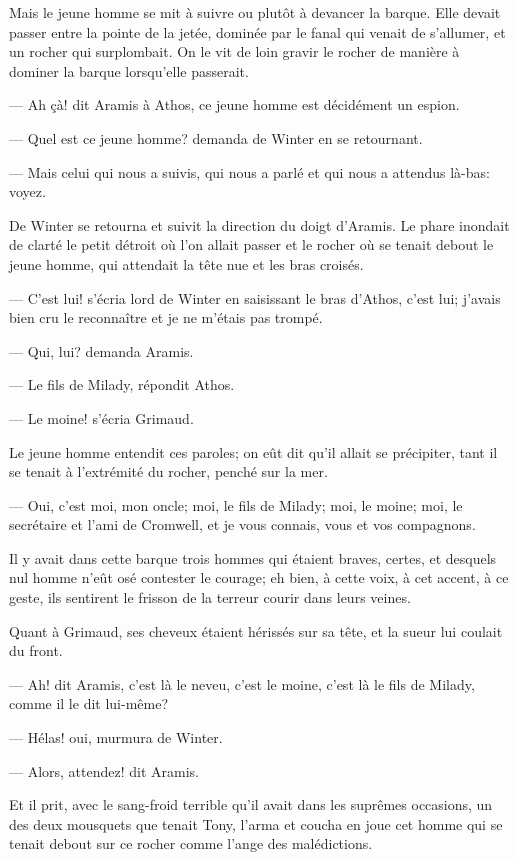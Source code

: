 Mais le jeune homme se mit à suivre ou plutôt à devancer la barque. Elle devait passer entre la pointe de la jetée, dominée par le fanal qui venait de s'allumer, et un rocher qui surplombait. On le vit de loin gravir le rocher de manière à dominer la barque lorsqu'elle passerait.

— Ah çà! dit Aramis à Athos, ce jeune homme est décidément un espion.

— Quel est ce jeune homme? demanda de Winter en se retournant.

— Mais celui qui nous a suivis, qui nous a parlé et qui nous a attendus là-bas: voyez.

De Winter se retourna et suivit la direction du doigt d'Aramis. Le phare inondait de clarté le petit détroit où l'on allait passer et le rocher où se tenait debout le jeune homme, qui attendait la tête nue et les bras croisés.

— C'est lui! s'écria lord de Winter en saisissant le bras d'Athos, c'est lui; j'avais bien cru le reconnaître et je ne m'étais pas trompé.

— Qui, lui? demanda Aramis.

— Le fils de Milady, répondit Athos.

— Le moine! s'écria Grimaud.

Le jeune homme entendit ces paroles; on eût dit qu'il allait se précipiter, tant il se tenait à l'extrémité du rocher, penché sur la mer.

— Oui, c'est moi, mon oncle; moi, le fils de Milady; moi, le moine; moi, le secrétaire et l'ami de Cromwell, et je vous connais, vous et vos compagnons.

Il y avait dans cette barque trois hommes qui étaient braves, certes, et desquels nul homme n'eût osé contester le courage; eh bien, à cette voix, à cet accent, à ce geste, ils sentirent le frisson de la terreur courir dans leurs veines.

Quant à Grimaud, ses cheveux étaient hérissés sur sa tête, et la sueur lui coulait du front.

— Ah! dit Aramis, c'est là le neveu, c'est le moine, c'est là le fils de Milady, comme il le dit lui-même?

— Hélas! oui, murmura de Winter.

— Alors, attendez! dit Aramis.

Et il prit, avec le sang-froid terrible qu'il avait dans les suprêmes occasions, un des deux mousquets que tenait Tony, l'arma et coucha en joue cet homme qui se tenait debout sur ce rocher comme l'ange des malédictions.

